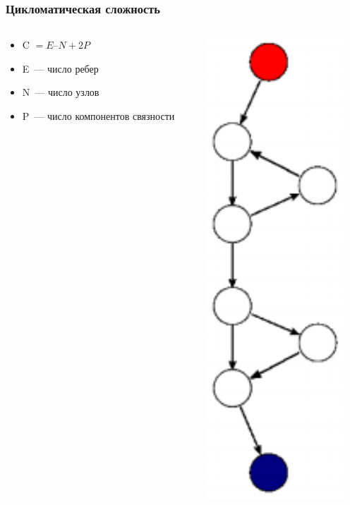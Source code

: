 \documentclass{../../slides-style}
\begin{document}
    \begin{frame}
        \frametitle{Цикломатическая сложность}
        \begin{columns}
            \begin{column}{0.7\textwidth}
                \begin{itemize}
                    \item C $= E – N + 2P$
                    \item E~--- число ребер
                    \item N~--- число узлов
                    \item P~--- число компонентов связности
                \end{itemize}
            \end{column}
            \begin{column}{0.3\textwidth}
                \begin{center}
                    \includegraphics[height=0.8\textheight]{programGraph.png}
                \end{center}
            \end{column}
        \end{columns}
    \end{frame}
\end{document}
